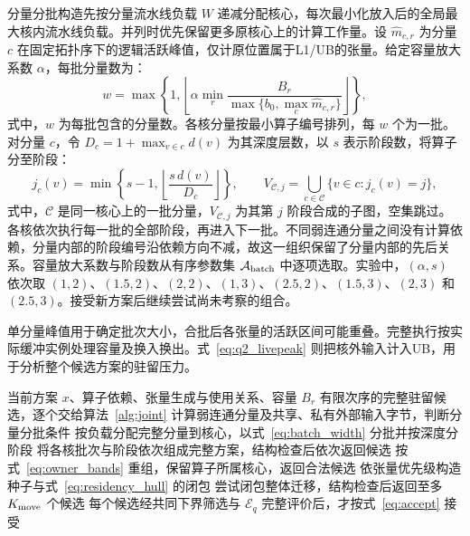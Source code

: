 分量分批构造先按分量流水线负载 $W$ 递减分配核心，每次最小化放入后的全局最大核内流水线负载。并列时优先保留更多原核心上的计算工作量。设 $\widehat m_{c,r}$ 为分量 $c$ 在固定拓扑序下的逻辑活跃峰值，仅计原位置属于L1/UB的张量。给定容量放大系数 $\alpha$，每批分量数为：
\begin{equation}
 w=\max\!\left\{1,\left\lfloor\alpha\min_r
 \frac{B_r}{\max\{b_0,\max_c\widehat m_{c,r}\}}\right\rfloor\right\},
 \label{eq:batch_width}
\end{equation}
\noindent 式中，$w$ 为每批包含的分量数。各核分量按最小算子编号排列，每 $w$ 个为一批。对分量 $c$，令 $D_c=1+\max_{v\in c}d(v)$ 为其深度层数，以 $s$ 表示阶段数，将算子分至阶段：
\begin{equation}
 j_c(v)=\min\!\left\{s-1,\left\lfloor\frac{s\,d(v)}{D_c}\right\rfloor\right\},
 \qquad V_{\mathcal C,j}=\bigcup_{c\in\mathcal C}\{v\in c:j_c(v)=j\},
 \label{eq:batch_stage}
\end{equation}
\noindent 式中，$\mathcal C$ 是同一核心上的一批分量，$V_{\mathcal C,j}$ 为其第 $j$ 阶段合成的子图，空集跳过。各核依次执行每一批的全部阶段，再进入下一批。不同弱连通分量之间没有计算依赖，分量内部的阶段编号沿依赖方向不减，故这一组织保留了分量内部的先后关系。容量放大系数与阶段数从有序参数集 $\mathcal A_{\rm batch}$ 中逐项选取。实验中，$(\alpha,s)$ 依次取 $(1,2)$、$(1.5,2)$、$(2,2)$、$(1,3)$、$(2.5,2)$、$(1.5,3)$、$(2,3)$ 和 $(2.5,3)$。接受新方案后继续尝试尚未考察的组合。

单分量峰值用于确定批次大小，合批后各张量的活跃区间可能重叠。完整执行按实际缓冲实例处理容量及换入换出。式~\eqref{eq:q2_livepeak} 则把核外输入计入UB，用于分析整个候选方案的驻留压力。

\begin{algorithm}[htbp]
\caption{核心级任务的驻留候选生成（第二、三问）}\label{alg:residency}
\small
\begin{algorithmic}[1]
\Require 当前方案 $x$、算子依赖、张量生成与使用关系、容量 $B_r$
\Ensure 有限次序的完整驻留候选，逐个交给算法~\ref{alg:joint}
\State 计算弱连通分量及共享、私有外部输入字节，判断分量分批条件
  \State 按负载分配完整分量到核心，以式~\eqref{eq:batch_width} 分批并按深度分阶段
  \State 将各核批次与阶段依次组成完整方案，结构检查后依次返回候选
 \EndFor
\Else
  \State 按式~\eqref{eq:owner_bands} 重组，保留算子所属核心，返回合法候选
 \EndFor
 \State 依张量优先级构造种子与式~\eqref{eq:residency_hull} 的闭包
 \State 尝试闭包整体迁移，结构检查后返回至多 $K_{\rm move}$ 个候选
\EndIf
\State 每个候选经共同下界筛选与 $\mathcal E_q$ 完整评价后，才按式~\eqref{eq:accept} 接受
\end{algorithmic}
\end{algorithm}

